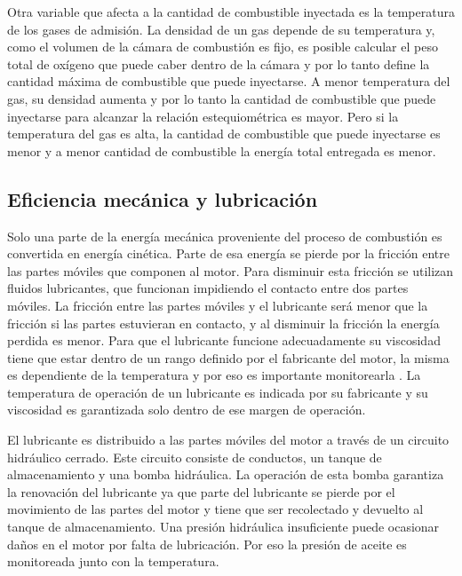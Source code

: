Otra variable que afecta a la cantidad de combustible inyectada es la temperatura de los gases de admisión. La densidad de un gas depende de su temperatura y, como el volumen de la cámara de combustión es fijo, es posible calcular el peso total de oxígeno que puede caber dentro de la cámara y por lo tanto define la cantidad máxima de combustible que puede inyectarse. A menor temperatura del gas, su densidad aumenta y por lo tanto la cantidad de combustible que puede inyectarse para alcanzar la relación estequiométrica es mayor. Pero si la temperatura del gas es alta, la cantidad de combustible que puede inyectarse es menor y a menor cantidad de combustible la energía total entregada es menor.

\subsection{Eficiencia mecánica y lubricación}

Solo una parte de la energía mecánica proveniente del proceso de combustión es convertida en energía cinética. Parte de esa energía se pierde por la fricción entre las partes móviles que componen al motor. Para disminuir esta fricción se utilizan fluidos lubricantes, que funcionan impidiendo el contacto entre dos partes móviles. La fricción entre las partes móviles y el lubricante será menor que la fricción si las partes estuvieran en contacto, y al disminuir la fricción la energía perdida es menor. Para que el lubricante funcione adecuadamente su viscosidad tiene que estar dentro de un rango definido por el fabricante del motor, la misma es dependiente de la temperatura y por eso es importante monitorearla \cite{lubrication}. La temperatura de operación de un lubricante es indicada por su fabricante y su viscosidad es garantizada solo dentro de ese margen de operación.

El lubricante es distribuido a las partes móviles del motor a través de un circuito hidráulico cerrado. Este circuito consiste de conductos, un tanque de almacenamiento y una bomba hidráulica. La operación de esta bomba garantiza la renovación del lubricante ya que parte del lubricante se pierde por el movimiento de las partes del motor y tiene que ser recolectado y devuelto al tanque de almacenamiento. Una presión hidráulica insuficiente puede ocasionar daños en el motor por falta de lubricación. Por eso la presión de aceite es monitoreada junto con la temperatura.


